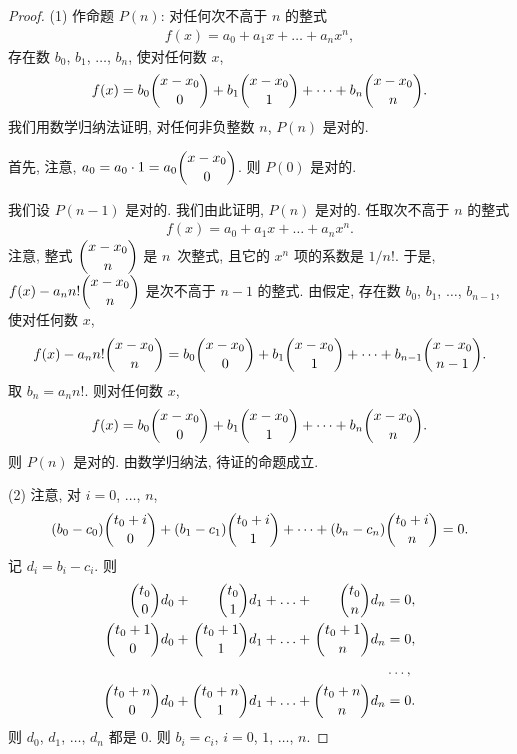 \documentclass[../libro.tex]{subfiles}
\begin{document}
\begin{proof}
    (1)
    作命题 \(P(n)\):
    对任何次不高于 \(n\) 的整式
    \begin{align*}
        f(x) = a_0 + a_1 x + \dots + a_n x^n,
    \end{align*}
    存在数 \(b_0\), \(b_1\), \(\dots\), \(b_n\),
    使对任何数 \(x\),
    \begin{align*}
        f(x) = b_0 \dbinom{x-x_0}{0}
        + b_1 \dbinom{x-x_0}{1} + \dots + b_n \dbinom{x-x_0}{n}.
    \end{align*}
    我们用数学归纳法证明, 对任何非负整数 \(n\), \(P(n)\) 是对的.

    首先, 注意, \(a_0 = a_0 \cdot 1 = a_0 \dbinom{x - x_0}{0}\).
    则 \(P(0)\) 是对的.

    我们设 \(P(n-1)\) 是对的.
    我们由此证明, \(P(n)\) 是对的.
    任取次不高于 \(n\) 的整式
    \begin{align*}
        f(x) = a_0 + a_1 x + \dots + a_n x^n.
    \end{align*}
    注意, 整式 \(\dbinom{x - x_0}{n}\) 是 \(n\)~次整式,
    且它的 \(x^n\) 项的系数是 \(1/n!\).
    于是, \(f(x) - a_n n! \dbinom{x - x_0}{n}\)
    是次不高于 \(n-1\) 的整式.
    由假定, 存在数 \(b_0\), \(b_1\), \(\dots\), \(b_{n-1}\),
    使对任何数 \(x\),
    \begin{align*}
        f(x) - a_n n! \dbinom{x - x_0}{n}
        = b_0 \dbinom{x-x_0}{0} + b_1 \dbinom{x-x_0}{1}
        + \dots + b_{n-1} \dbinom{x-x_0}{n-1}.
    \end{align*}
    取 \(b_n = a_n n!\).
    则对任何数 \(x\),
    \begin{align*}
        f(x) = b_0 \dbinom{x-x_0}{0}
        + b_1 \dbinom{x-x_0}{1} + \dots + b_n \dbinom{x-x_0}{n}.
    \end{align*}
    则 \(P(n)\) 是对的.
    由数学归纳法, 待证的命题成立.

    (2)
    注意, 对 \(i = 0\), \(\dots\), \(n\),
    \begin{align*}
        (b_0 - c_0) \dbinom{t_0+i}{0}
        + (b_1 - c_1) \dbinom{t_0+i}{1}
        + \dots
        + (b_n - c_n) \dbinom{t_0+i}{n} = 0.
    \end{align*}
    记 \(d_i = b_i - c_i\).
    则
    \begin{equation*}
        \begin{alignedat}{7}
            \dbinom{t_0}{0} d_0   & {} + {} & \dbinom{t_0}{1} d_1   & {} + {} & \dots & {} + {} & \dbinom{t_0}{n} d_n   & {} = 0, \\
            \dbinom{t_0+1}{0} d_0 & {} + {} & \dbinom{t_0+1}{1} d_1 & {} + {} & \dots & {} + {} & \dbinom{t_0+1}{n} d_n & {} = 0, \\
            {}                    &         &                       &         &       &         &                       & \dots,  \\
            \dbinom{t_0+n}{0} d_0 & {} + {} & \dbinom{t_0+n}{1} d_1 & {} + {} & \dots & {} + {} & \dbinom{t_0+n}{n} d_n & {} = 0.
        \end{alignedat}
    \end{equation*}
    则 \(d_0\), \(d_1\), \(\dots\), \(d_n\)
    都是 \(0\).
    则 \(b_i = c_i\),
    \(i = 0\), \(1\), \(\dots\), \(n\).


\end{proof}
\end{document}
